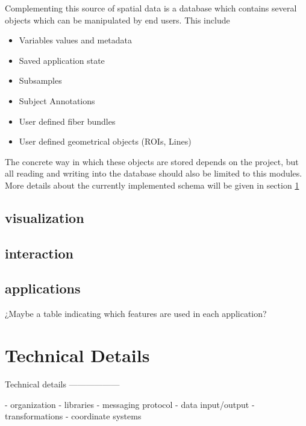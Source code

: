 Complementing this source of spatial data is a database which contains several objects which can be manipulated by end users. This include

\begin{itemize}
\item Variables values and metadata
\item Saved application state
\item Subsamples
\item Subject Annotations
\item User defined fiber bundles
\item User defined geometrical objects (ROIs, Lines)
\end{itemize}

The concrete way in which these objects are stored depends on the project, but all reading and writing into the database should also be limited to this modules. More details about the currently implemented schema will be given in section \ref{sec_tech}


\subsection{visualization}


\subsection{interaction}

\subsection{applications}

¿Maybe a table indicating which features are used in each application?

\section{Technical Details}

\label{sec_tech} 

Technical details
------------------

- organization
- libraries
- messaging protocol
- data input/output
- transformations
- coordinate systems


